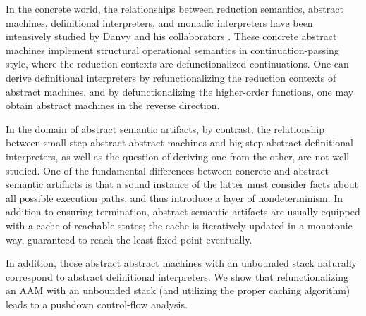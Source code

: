 \documentclass[acmsmall, screen]{acmart}\settopmatter{}
\begin{document}
In the concrete world, the relationships between reduction semantics, abstract machines,
definitional interpreters, and monadic interpreters have been intensively studied by
Danvy and his collaborators \cite{Ager:2003:FCE:888251.888254, Danvy:2001:DW:773184.773202,
danvy2004refocusing, Danvy:2008:DIP:1411204.1411206, AGER2004223, ager2005functional,
Danvy:2006:RW:2171265.2171268, danvy2009towards, biernacka2009towards}.
These concrete abstract machines implement structural operational semantics in
continuation-passing style, where the reduction contexts are defunctionalized continuations.
One can derive definitional interpreters by refunctionalizing the reduction contexts of
abstract machines, and by defunctionalizing the higher-order functions, one may obtain
abstract machines in the reverse direction.

In the domain of abstract semantic artifacts, by contrast, the relationship between small-step
abstract abstract machines and big-step abstract definitional interpreters, as well as the
question of deriving one from the other, are not well studied.
One of the fundamental differences between concrete and abstract semantic
artifacts is that a sound instance of the latter must consider facts about all possible execution
paths, and thus introduce a layer of nondeterminism. In addition to ensuring termination, abstract semantic
artifacts are usually equipped with a cache of reachable states; the cache is
iteratively updated in a monotonic way, guaranteed to reach the least fixed-point eventually.

In addition, those abstract abstract machines with an unbounded stack naturally correspond
to abstract definitional interpreters. We show that refunctionalizing an AAM with an
unbounded stack (and utilizing the proper caching algorithm) leads to a pushdown control-flow analysis.
\end{document}
